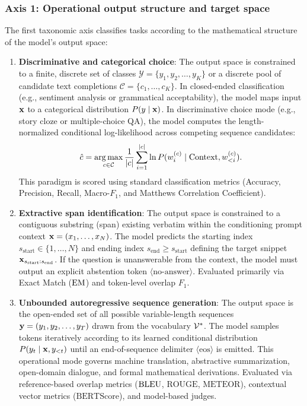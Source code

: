 \documentclass[../../../main.tex]{subfiles}
\begin{document}
\subsubsection{Axis 1: Operational output structure and target space}
The first taxonomic axis classifies tasks according to the mathematical structure of the model's output space:
\begin{enumerate}
    \item \textbf{Discriminative and categorical choice}: The output space is constrained to a finite, discrete set of classes $\mathcal{Y} = \{y_1, y_2, \dots, y_K\}$ or a discrete pool of candidate text completions $\mathcal{C} = \{c_1, \dots, c_K\}$. In closed-ended classification (e.g., sentiment analysis or grammatical acceptability), the model maps input $\mathbf{x}$ to a categorical distribution $P(y \mid \mathbf{x})$. In discriminative choice mode (e.g., story cloze or multiple-choice QA), the model computes the length-normalized conditional log-likelihood across competing sequence candidates:
    \begin{equation}
    \label{eq:discriminative_choice}
    \hat{c} = \operatorname*{\mathrm{arg\,max}}_{c \in \mathcal{C}} \frac{1}{|c|} \sum_{i=1}^{|c|} \ln P(w_i^{(c)} \mid \text{Context}, w_{<i}^{(c)}).
    \end{equation}
    This paradigm is scored using standard classification metrics (Accuracy, Precision, Recall, Macro-$F_1$, and Matthews Correlation Coefficient).
    \item \textbf{Extractive span identification}: The output space is constrained to a contiguous substring (span) existing verbatim within the conditioning prompt context $\mathbf{x} = (x_1, \dots, x_N)$. The model predicts the starting index $s_{\text{start}} \in \{1, \dots, N\}$ and ending index $s_{\text{end}} \ge s_{\text{start}}$ defining the target snippet $\mathbf{x}_{s_{\text{start}}:s_{\text{end}}}$. If the question is unanswerable from the context, the model must output an explicit abstention token $\langle\text{no-answer}\rangle$. Evaluated primarily via Exact Match ($\mathrm{EM}$) and token-level overlap $F_1$.
    \item \textbf{Unbounded autoregressive sequence generation}: The output space is the open-ended set of all possible variable-length sequences $\mathbf{y} = (y_1, y_2, \dots, y_T)$ drawn from the vocabulary $\mathcal{V}^*$. The model samples tokens iteratively according to its learned conditional distribution $P(y_t \mid \mathbf{x}, y_{<t})$ until an end-of-sequence delimiter $\langle\text{eos}\rangle$ is emitted. This operational mode governs machine translation, abstractive summarization, open-domain dialogue, and formal mathematical derivations. Evaluated via reference-based overlap metrics ($\mathrm{BLEU}$, $\text{ROUGE}$, $\text{METEOR}$), contextual vector metrics ($\text{BERTScore}$), and model-based judges.
\end{enumerate}
\end{document}

